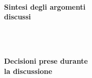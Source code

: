 \documentclass[10pt, a4paper]{article}
\title{\data}
\author{SWEetCode}
\begin{document}


\setlength{\columnsep}{2.2em}
\setlength{\columnseprule}{4pt}
\begin{paracol}{2}


\intestazione
\vspace{5.0em}

\partecipanti

\newpage

\switchcolumn
\revisioneAzioni
\vspace{20.4em}

\ordineGiorno

\newpage


\switchcolumn

\\
\textbf{Sintesi degli argomenti\\discussi}

~\newpage


\\
\textbf{Decisioni prese durante\\la discussione}

\switchcolumn

\discussione


\newpage

\decisioni

\end{paracol}
\vspace{5em}


\end{document}
